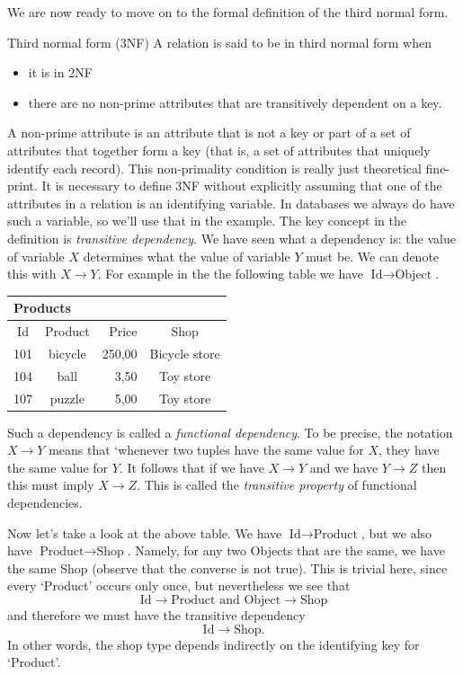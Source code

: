 We are now ready to move on to the formal definition of the third normal form.
\begin{terminology}{Third normal form (3NF)}
A relation is said to be in third normal form when
\begin{itemize}
\item it is in 2NF
\item there are no non-prime attributes that are transitively dependent on a key.
\end{itemize}
\end{terminology}
A non-prime attribute is an attribute that is not a key or part of a set of
attributes that together form a key (that is, a set of attributes that uniquely
identify each record). This non-primality condition is really just theoretical
fine-print. It is necessary to define 3NF without explicitly assuming that one
of the attributes in a relation is an identifying variable.  In databases we
always do have such a variable, so we'll use that in the example. The key
concept in the definition is \emph{transitive dependency}.  We have seen what a
dependency is: the value of variable $X$ determines what the value of variable
$Y$ must be. We can denote this with $X\to Y$. For example in the the following
table we have $\textrm{Id}\to \textrm{Object}$.
\begin{center}
\begin{tabular}{|ccrc|}
\multicolumn{4}{l}{Products}\\
\hline
Id  & Product & Price &Shop          \\ 
\hline                       
101 & bicycle& 250,00 &Bicycle store     \\
104 & ball   & 3,50   &Toy store \\
107 & puzzle & 5,00   &Toy store     \\
\hline
\end{tabular}
\end{center}
Such a dependency is called a \emph{functional dependency}. To be precise, the
notation $X\to Y$ means that `whenever two tuples have the same value for
$X$, they have the same value for $Y$. It follows that if we have $X\to Y$ and
we have $Y\to Z$ then this must imply $X\to Z$. This is called the
\emph{transitive property} of functional dependencies.

Now let's take a look at the above table. We have $\textrm{Id}\to
\textrm{Product}$, but we also have $\textrm{Product}\to\textrm{Shop}$.
Namely, for any two Objects that are the same, we have the same Shop (observe
that the converse is not true). This is
trivial here, since every `Product' occurs only once, but nevertheless we see
that
$$
\textrm{Id}\to\textrm{Product}\textrm{ and }\textrm{Object}\to\textrm{Shop}
$$
and therefore we must have the transitive dependency
$$
\textrm{Id}\to \textrm{Shop}.
$$
In other words, the shop type depends indirectly on the identifying key for
`Product'. 

